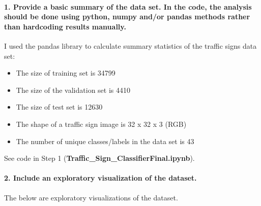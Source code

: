 \documentclass[11pt]{article}
\providecommand{\tightlist}{%
      \setlength{\itemsep}{0pt}\setlength{\parskip}{0pt}}
\begin{document}
\hypertarget{provide-a-basic-summary-of-the-data-set.-in-the-code-the-analysis-should-be-done-using-python-numpy-andor-pandas-methods-rather-than-hardcoding-results-manually.}{%
\paragraph{1. Provide a basic summary of the data set. In the code, the
analysis should be done using python, numpy and/or pandas methods rather
than hardcoding results
manually.}\label{provide-a-basic-summary-of-the-data-set.-in-the-code-the-analysis-should-be-done-using-python-numpy-andor-pandas-methods-rather-than-hardcoding-results-manually.}}

I used the pandas library to calculate summary statistics of the traffic
signs data set:

\begin{itemize}
\tightlist
\item
  The size of training set is 34799
\item
  The size of the validation set is 4410
\item
  The size of test set is 12630
\item
  The shape of a traffic sign image is 32 x 32 x 3 (RGB)
\item
  The number of unique classes/labels in the data set is 43
\end{itemize}

See code in Step 1 (\textbf{Traffic\_Sign\_ClassifierFinal.ipynb}).

\hypertarget{include-an-exploratory-visualization-of-the-dataset.}{%
\paragraph{2. Include an exploratory visualization of the
dataset.}\label{include-an-exploratory-visualization-of-the-dataset.}}

The below are exploratory visualizations of the dataset.
\end{document}
